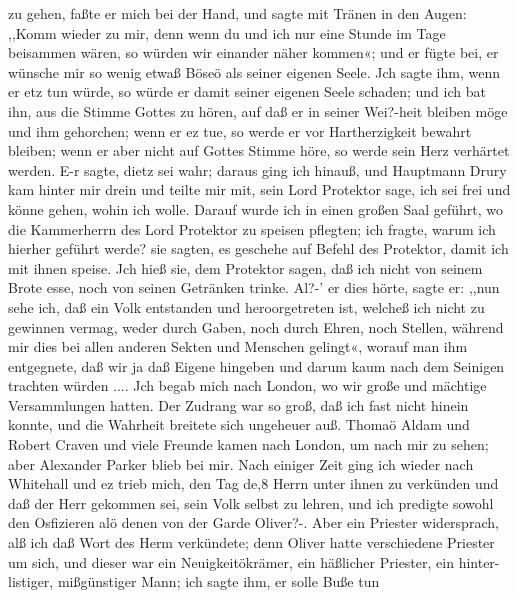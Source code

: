 zu gehen, faßte er mich bei der Hand, und sagte mit Tränen in
den Augen: ,,Komm wieder zu mir, denn wenn du und ich nur
eine Stunde im Tage beisammen wären, so würden wir einander
näher kommen«; und er fügte bei, er wünsche mir so wenig etwaß
Böseö als seiner eigenen Seele. Jch sagte ihm, wenn er etz tun
würde, so würde er damit seiner eigenen Seele schaden; und ich
bat ihn, aus die Stimme Gottes zu hören, auf daß er in seiner
Wei?-heit bleiben möge und ihm gehorchen; wenn er ez tue, so
werde er vor Hartherzigkeit bewahrt bleiben; wenn er aber
nicht auf Gottes Stimme höre, so werde sein Herz verhärtet
werden. E-r sagte, dietz sei wahr; daraus ging ich hinauß, und
Hauptmann Drury kam hinter mir drein und teilte mir mit, sein
Lord Protektor sage, ich sei frei und könne gehen, wohin ich
wolle. Darauf wurde ich in einen großen Saal geführt, wo
die Kammerherrn des Lord Protektor zu speisen pflegten; ich fragte,
warum ich hierher geführt werde? sie sagten, es geschehe auf
Befehl des Protektor, damit ich mit ihnen speise. Jch hieß sie,
dem Protektor sagen, daß ich nicht von seinem Brote esse, noch
von seinen Getränken trinke. Al?-’ er dies hörte, sagte er: ,,nun
sehe ich, daß ein Volk entstanden und heroorgetreten ist, welcheß
ich nicht zu gewinnen vermag, weder durch Gaben, noch durch
Ehren, noch Stellen, während mir dies bei allen anderen Sekten
und Menschen gelingt«, worauf man ihm entgegnete, daß wir
ja daß Eigene hingeben und darum kaum nach dem Seinigen
trachten würden ....
Jch begab mich nach London, wo wir große und mächtige
Versammlungen hatten. Der Zudrang war so groß, daß ich fast
nicht hinein konnte, und die Wahrheit breitete sich ungeheuer auß.
Thomaö Aldam und Robert Craven und viele Freunde kamen
nach London, um nach mir zu sehen; aber Alexander Parker
blieb bei mir.
Nach einiger Zeit ging ich wieder nach Whitehall und ez
trieb mich, den Tag de,8 Herrn unter ihnen zu verkünden und
daß der Herr gekommen sei, sein Volk selbst zu lehren, und ich
predigte sowohl den Osfizieren alö denen von der Garde Oliver?-.
Aber ein Priester widersprach, alß ich daß Wort des Herm
verkündete; denn Oliver hatte verschiedene Priester um sich, und
dieser war ein Neuigkeitökrämer, ein häßlicher Priester, ein hinter-
listiger, mißgünstiger Mann; ich sagte ihm, er solle Buße tun


